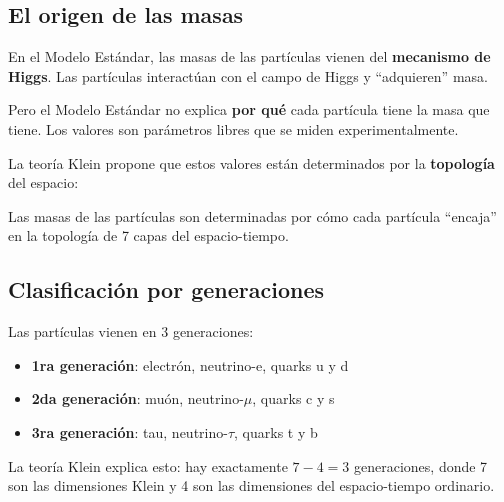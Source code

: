 \documentclass[12pt,a4paper,openany]{book}
\begin{document}
\begin{nivelconceptual}

\section*{El origen de las masas}

En el Modelo Estándar, las masas de las partículas vienen del \textbf{mecanismo de Higgs}. Las partículas interactúan con el campo de Higgs y ``adquieren'' masa.

Pero el Modelo Estándar no explica \textbf{por qué} cada partícula tiene la masa que tiene. Los valores son parámetros libres que se miden experimentalmente.

La teoría Klein propone que estos valores están determinados por la \textbf{topología} del espacio:

\begin{formulabox}
Las masas de las partículas son determinadas por cómo cada partícula ``encaja'' en la topología de 7 capas del espacio-tiempo.
\end{formulabox}

\subsection*{Clasificación por generaciones}

Las partículas vienen en 3 generaciones:
\begin{itemize}
    \item \textbf{1ra generación}: electrón, neutrino-e, quarks u y d
    \item \textbf{2da generación}: muón, neutrino-$\mu$, quarks c y s
    \item \textbf{3ra generación}: tau, neutrino-$\tau$, quarks t y b
\end{itemize}

La teoría Klein explica esto: hay exactamente $7 - 4 = 3$ generaciones, donde 7 son las dimensiones Klein y 4 son las dimensiones del espacio-tiempo ordinario.

\end{nivelconceptual}
\end{document}
